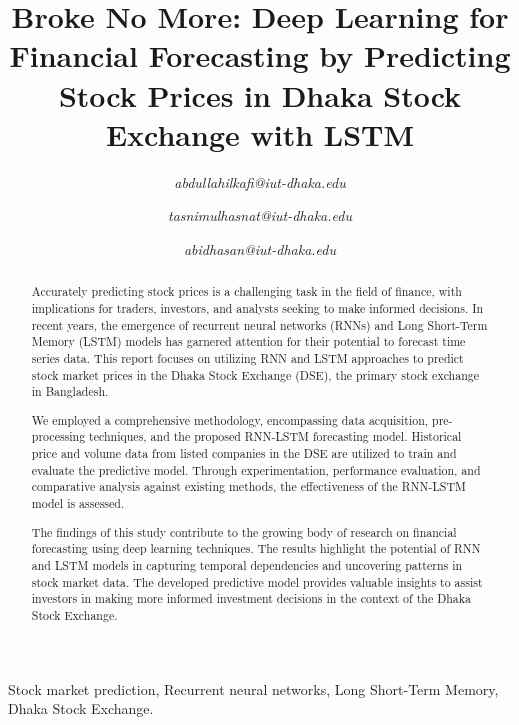\documentclass[conference]{IEEEtran}
\begin{document}
\title{Broke No More: Deep Learning for Financial Forecasting by Predicting Stock Prices in Dhaka Stock Exchange with LSTM}

\author{
\textit{abdullahilkafi@iut-dhaka.edu}
\and
{}
\textit{tasnimulhasnat@iut-dhaka.edu}
\and
{}
\textit{abidhasan@iut-dhaka.edu}
}

\maketitle

\begin{abstract}
Accurately predicting stock prices is a challenging task in the field of finance, with implications for traders, investors, and analysts seeking to make informed decisions. In recent years, the emergence of recurrent neural networks (RNNs) and Long Short-Term Memory (LSTM) models has garnered attention for their potential to forecast time series data. This report focuses on utilizing RNN and LSTM approaches to predict stock market prices in the Dhaka Stock Exchange (DSE), the primary stock exchange in Bangladesh.

We employed a comprehensive methodology, encompassing data acquisition, pre-processing techniques, and the proposed RNN-LSTM forecasting model. Historical price and volume data from listed companies in the DSE are utilized to train and evaluate the predictive model. Through experimentation, performance evaluation, and comparative analysis against existing methods, the effectiveness of the RNN-LSTM model is assessed.

The findings of this study contribute to the growing body of research on financial forecasting using deep learning techniques. The results highlight the potential of RNN and LSTM models in capturing temporal dependencies and uncovering patterns in stock market data. The developed predictive model provides valuable insights to assist investors in making more informed investment decisions in the context of the Dhaka Stock Exchange.
\end{abstract}

\begin{IEEEkeywords}
Stock market prediction, Recurrent neural networks, Long Short-Term Memory, Dhaka Stock Exchange.
\end{IEEEkeywords}
\end{document}

